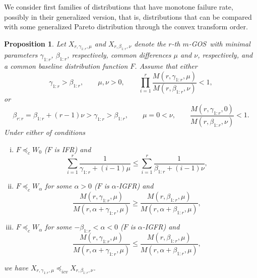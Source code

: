 \documentclass [11pt]{article}
\newtheorem{proposition}{Proposition}
\newcommand{\gos}{GOS}
\begin{document}
We consider first families of distributions that have monotone failure rate, possibly in their generalized version, that is, distributions that can be compared with some generalized Pareto distribution through the convex transform order.
{\samepage
\begin{proposition}\label{c2}
Let $X_{r,\gamma_{1:r},\mu}$ and $X_{r,\beta_{1:r},\nu}$ denote the $r$-th $m$-\gos\ with minimal parameters $\gamma_{1:r}$, $\beta_{1:r}$,
respectively, common differences $\mu$ and $\nu$, respectively, and a common baseline distribution function $F$. Assume that either
\begin{equation*}
\label{18}
\gamma_{1:r} > \beta_{1:r},  \qquad \mu,\nu >0, \qquad \prod_{i=1}^r
\frac{M(r,\gamma_{1:r},\mu)}{M(r,\beta_{1:r},\nu)}<1,
\end{equation*}
or
\begin{equation*}
\label{19}
\beta_{r:r}= \beta_{1:r}+(r-1)\nu > \gamma_{1:r} > \beta_{1:r},
\qquad \mu= 0 < \nu,
\qquad 
\frac{M(r,\gamma_{1:r},0)}{M(r,\beta_{1:r},\nu)}<1.
\end{equation*}
Under either of conditions
\begin{enumerate}[(i)]
\item
$F\preceq_c W_0$ ($F$ is IFR) and
\begin{equation}
\label{20}
\sum_{i=1}^r \frac{1}{\gamma_{1:r}+ (i-1)\mu} \leq
\sum_{i=1}^r \frac{1}{\beta_{1:r}+ (i-1)\nu},
\end{equation}

\item
$F\preceq_c W_\alpha$ for some $\alpha >0$ ($F$ is $\alpha$-IGFR) and
\begin{equation}
\label{21}
\frac{M(r,\gamma_{1:r},\mu)}{M(r,\alpha+\gamma_{1:r},\mu)} \geq \frac{M(r,\beta_{1:r},\mu)}{M(r,\alpha+\beta_{1:r},\mu)},
\end{equation}

\item
$F\preceq_c W_\alpha$ for some $-\beta_{1:r} < \alpha <0$
($F$ is $\alpha$-IGFR) and
\begin{equation}
\label{22}
\frac{M(r,\gamma_{1:r},\mu)}{M(r,\alpha+\gamma_{1:r},\mu)} \leq \frac{M(r,\beta_{1:r},\mu)}{M(r,\alpha+\beta_{1:r},\mu)},
\end{equation}
\end{enumerate}
we have $X_{r,\gamma_{1:r},\mu} \preceq_{icv}X_{r,\beta_{1:r},\nu}$.
\end{proposition}}
\end{document}
